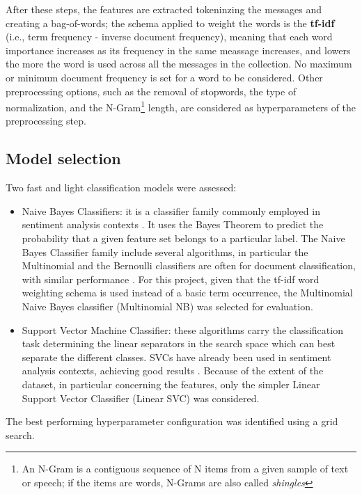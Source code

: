 \documentclass[conference]{IEEEtran}
\begin{document}
After these steps, the features are extracted tokeninzing the messages and creating a bag-of-words; the schema applied to weight the words is the \textbf{tf-idf} (i.e., term frequency - inverse document frequency), meaning that each word importance increases as its frequency in the same meassage increases, and lowers the more the word is used across all the messages in the collection. No maximum or minimum document frequency is set for a word to be considered. Other preprocessing options, such as the removal of stopwords, the type of normalization, and the N-Gram\footnote{An N-Gram is a contiguous sequence of N items from a given sample of text or speech; if the items are words, N-Grams are also called \textit{shingles}} length, are considered as hyperparameters of the preprocessing step.
\subsection{Model selection}
Two fast and light classification models were assessed: 
\begin{itemize}
    \item Naive Bayes Classifiers: it is a classifier family commonly employed in sentiment analysis contexts \cite{MEDHAT20141093}. It uses the Bayes Theorem to predict the probability that a given feature set belongs to a particular label. The Naive Bayes Classifier family include several algorithms, in particular the Multinomial and the Bernoulli classifiers are often for document classification, with similar performance \cite{8776800}. For this project, given that the tf-idf word weighting schema is used instead of a basic term occurrence, the Multinomial Naive Bayes classifier (Multinomial NB) was selected for evaluation.
    \item Support Vector Machine Classifier: these algorithms carry the classification task determining the linear separators in the search space which can best separate the different classes. SVCs have already been used in sentiment analysis contexts, achieving good results \cite{6914200}. Because of the extent of the dataset, in particular concerning the features, only the simpler Linear Support Vector Classifier (Linear SVC) was considered. 
\end{itemize}
The best performing hyperparameter configuration was identified using a grid search. 
\end{document}
